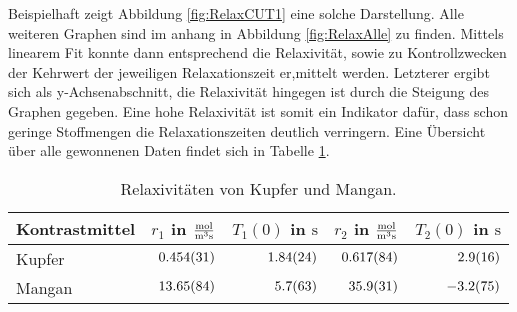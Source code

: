 Beispielhaft zeigt Abbildung \ref{fig:RelaxCUT1} eine solche Darstellung.
Alle weiteren Graphen sind im anhang in Abbildung \ref{fig:RelaxAlle} zu finden.
Mittels linearem Fit konnte dann entsprechend die Relaxivität, sowie zu Kontrollzwecken der Kehrwert der jeweiligen Relaxationszeit er,mittelt werden.
Letzterer ergibt sich als y-Achsenabschnitt, die Relaxivität hingegen ist durch die Steigung des Graphen gegeben.
Eine hohe Relaxivität ist somit ein Indikator dafür, dass schon geringe Stoffmengen die Relaxationszeiten deutlich verringern.
Eine Übersicht über alle gewonnenen Daten findet sich in Tabelle \ref{tab:Relaxivitat}.

\begin{table}[H]
    \centering
    \caption{Relaxivitäten von Kupfer und Mangan.}
    \begin{tabular}{|l||r|r|r|r|} \hline
        Kontrastmittel & $r_{1}$ in $\si{\frac{\mol}{\metre \cubed \second}}$    &  $T_{1}(0)$ in $\si{\second}$ & $r_{2}$ in $\si{\frac{\mol}{\metre \cubed \second}}$ & $T_{2}(0)$ in $\si{\second}$  \\ \hline \hline
        Kupfer & $\SI{0.454 \pm 0.031}{}$   & $\SI{1.84 \pm 0.24}{}$    & $\SI{0.617 \pm 0.084}{}$   & $\SI{2.9  \pm 1.6}{}$ \\ \hline
        Mangan & $\SI{13.65 \pm 0.84}{}$    & $\SI{5.7 \pm 6.3}{}$      & $\SI{35.9 \pm 3.1}{}$  & $\SI{-3.2 \pm 7.5}{}$ \\ \hline
    \end{tabular} 
    \label{tab:Relaxivitat} 
\end{table}

